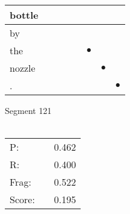 \documentclass[landscape]{article}
\newcommand{\ssp}{\hspace{2pt}}
\newcommand{\mex}{\cellcolor{g}$\bullet$}
\begin{document}
\begin{tabular}{|l|p{10pt}|p{10pt}|p{10pt}|p{10pt}|p{10pt}|p{10pt}|p{10pt}|}
\hline
\ssp bottle \ssp&\hspace{2pt}&\hspace{2pt}&\hspace{2pt}&\hspace{2pt}&\hspace{2pt}&\hspace{2pt}&\hspace{2pt}\\
\hline
\ssp by \ssp&\hspace{2pt}&\hspace{2pt}&\hspace{2pt}&\hspace{2pt}&\hspace{2pt}&\hspace{2pt}&\hspace{2pt}\\
\hline
\ssp \cellcolor{ref4}the \ssp&\hspace{2pt}&\hspace{2pt}&\hspace{2pt}&\hspace{2pt}&\hspace{2pt}\mex&\hspace{2pt}&\hspace{2pt}\\
\hline
\ssp \cellcolor{ref5}nozzle \ssp&\hspace{2pt}&\hspace{2pt}&\hspace{2pt}&\hspace{2pt}&\hspace{2pt}&\hspace{2pt}\mex&\hspace{2pt}\\
\hline
\ssp \cellcolor{ref6}. \ssp&\hspace{2pt}&\hspace{2pt}&\hspace{2pt}&\hspace{2pt}&\hspace{2pt}&\hspace{2pt}&\hspace{2pt}\mex\\
\hline
\end{tabular}

\vspace{6pt}
\noindent Segment 121\\\\
\noindent\begin{tabular}{lm{12pt}r}
\hline
P:&&0.462\\
R:&&0.400\\
Frag:&&0.522\\
Score:&&0.195\\
\end{tabular}
\end{document}
